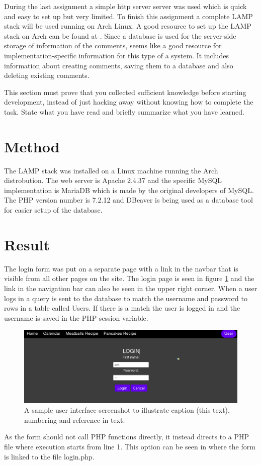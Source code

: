 \documentclass[a4paper]{scrartcl}
\begin{document}
During the last assignment a simple http server server \citet{noauthor_http-server_nodate} was used which is quick and easy to set up but very limited. To finish this assignment a complete LAMP stack will be used running on Arch Linux. A good resource to set up the LAMP stack on Arch can be found at \citet{sk_install_2016}. Since a database is used for the server-side storage of information of the comments, \citet{noauthor_9_2017} seems like a good resource for implementation-specific information for this type of a system. It includes information about creating comments, saving them to a database and also deleting existing comments. 


This section must prove that you collected sufficient knowledge before starting development, instead of just hacking away without knowing how to complete the task. State what you have read and briefly summarize what you have learned.

\section{Method}

The LAMP stack was installed on a Linux machine running the Arch distrobution. The web server is Apache 2.4.37 and the specific MySQL implementation is MariaDB which is made by the original developers of MySQL. The PHP version number is 7.2.12 and DBeaver is being used as a database tool for easier setup of the database.

\section{Result}

The login form was put on a separate page with a link in the navbar that is visible from all other pages on the site. The login page is seen in figure \ref{fig:login_form} and the link in the navigation bar can also be seen in the upper right corner. When a user logs in a query is sent to the database to match the username and password to rows in a table called Users. If there is a match the user is logged in and the username is saved in the PHP session variable. 
\begin{figure}[h!]
  \begin{center}
    \includegraphics[scale=0.3]{images/login_form.png}
    \caption{A sample user interface screenshot to illustrate caption (this text), numbering and reference in text.}
    \label{fig:login_form}
  \end{center}
\end{figure}
As the form should not call PHP functions directly, it instead directs to a PHP file where execution starts from line 1. This option can be seen in \citet{kimblad_git_2019-php_call} where the form is linked to the file login.php.
\end{document}
